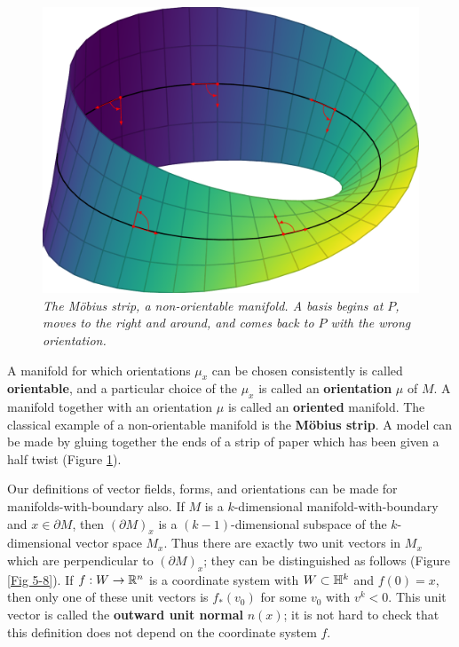 \begin{figure}[!htb]
    \centering
    \includegraphics[width=.75\linewidth]{./pics/Fig5-7.pdf}
    \caption{\textit{The M\"obius strip, a non-orientable manifold. A
    basis begins at $P$, moves to the right and around, and comes back to $P$ with
    the wrong orientation.}}
    \label{Fig 5-7}
\end{figure}

A manifold for which orientations $\mu_x$ can be chosen consistently is called \textbf{orientable}, 
and a particular choice of the $\mu_x$ is called an \textbf{orientation} $\mu$ of $M$.
A manifold together with an orientation $\mu$ is called an \textbf{oriented} manifold.
The classical example of a non-orientable manifold is the \textbf{M\"obius strip}.
A model can be made by gluing together the ends of a strip of
paper which has been given a half twist (Figure \ref{Fig 5-7}).

Our definitions of vector fields, forms, and orientations can be made for 
manifolds-with-boundary also. If $M$ is a $k$-dimensional manifold-with-boundary 
and $x\in \partial M$, then $(\partial M)_x$ is a $(k-1)$-dimensional subspace of the 
$k$-dimensional vector space $M_x$. Thus there are exactly two unit vectors in $M_x$
which are perpendicular to $(\partial M)_x$; they can be distinguished as follows 
(Figure \ref{Fig 5-8}). If $f: W\to \mathbb{R}^n$ is a coordinate system with $W\subset \mathbb{H}^k$ and 
$f(0) = x$, then only one of these unit vectors is $f_*(v_0)$ for some $v_0$ with $v^k < 0$.
This unit vector is called the \textbf{outward unit normal} $n(x)$; it is not hard to check that this
definition does not depend on the coordinate system $f$.

